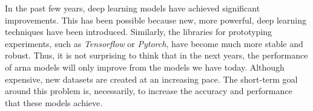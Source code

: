 

In the past few years, deep learning models have achieved
significant improvements. This has been possible because
new, more powerful, deep learning techniques have been
introduced. Similarly, the libraries for prototyping
experiments, such as \emph{Tensorflow}
\parencite{abadi2016tensorflow} or \emph{Pytorch}, have
become much more stable and robust. Thus, it is not
surprising to think that in the next years, the performance
of \gls{arna} models will only improve from the models we
have today. Although expensive, new datasets are created at
an increasing pace. The short-term goal around this problem
is, necessarily, to increase the accuracy and performance
that these models achieve.
